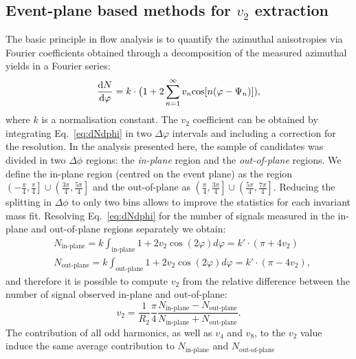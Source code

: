 \subsection{Event-plane based methods for $v_2$ extraction} 
\label{sec:epMethodsDescript}
The basic principle in flow analysis is to quantify the azimuthal 
anisotropies via Fourier coefficients obtained through a 
decomposition of the measured azimuthal yields in a Fourier series:
\begin{equation}
\label{eq:dNdphi}
\frac{{\rm d} N}{{\rm d} \varphi} = k \cdot \big ( 1 + 2 \sum_{n=1}^{\infty} v_n {\rm cos}[n (\varphi - \Psi_n)] ),
\end{equation}
where $k$ is a normalisation constant. 
The $v_2$ coefficient can be obtained by integrating Eq.~\ref{eq:dNdphi}
in two $\Delta \varphi$ intervals and including a correction for the
resolution. In the analysis presented here, the sample of candidates was 
divided in two $\Delta\phi$ regions: the \textit{in-plane} region 
and the \textit{out-of-plane} regions. We define the in-plane 
region (centred on the event plane) as the region 
$\left(-\frac{\pi}{4},\frac{\pi}{4}\right]\cup\left(\frac{3\pi}{4},\frac{5\pi}{4}\right]$ and
 the out-of-plane as $\left(\frac{\pi}{4},\frac{3\pi}{4}\right]\cup\left(\frac{5\pi}{4},\frac{7\pi}{4}\right]$. 
 Reducing the splitting in $\Delta\phi$ to only two bins allows 
 to improve the statistics for each invariant mass fit. Resolving 
 Eq.~\ref{eq:dNdphi} for the number of signals measured 
 in the in-plane and out-of-plane regions separately we obtain:
\begin{equation}\label{eq:ninout}
 \begin{split}
  & N_\text{in-plane} = k\int_\text{in-plane}1+2v_2\cos(2\varphi)d\varphi = k'\cdot(\pi+4v_2)\\
  & N_\text{out-plane} = k\int_\text{out-plane}1+2v_2\cos(2\varphi)d\varphi= k'\cdot(\pi-4v_2),
 \end{split}
\end{equation}
and therefore it is possible to compute $v_2$ from the relative 
difference between the number of signal observed in-plane and out-of-plane:
\begin{equation}
\label{eq:anis}
 v_2 = \frac{1}{R_2} \frac{\pi}{4}\frac{N_\text{in-plane}-N_\text{out-plane}}{N_\text{in-plane}+N_\text{out-plane}}.
\end{equation}
The contribution of all odd harmonics, 
as well as $v_4$ and $v_8$, to the $v_2$ value induce the same average 
contribution to $N_\text{in-plane}$ and $N_\text{out-of-plane}$ 
